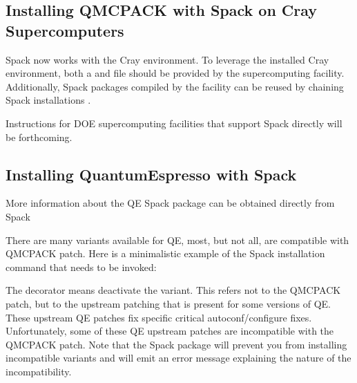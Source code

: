 \documentclass[letterpaper,10pt,english]{sphinxmanual}
\begin{document}
\subsection{Installing QMCPACK with Spack on Cray Supercomputers}
\label{\detokenize{installation:installing-qmcpack-with-spack-on-cray-supercomputers}}
Spack now works with the Cray environment. To leverage the installed
Cray environment, both a  and
 file should be provided by the supercomputing
facility. Additionally, Spack packages compiled by the facility can be
reused by chaining Spack installations
.

Instructions for DOE supercomputing facilities that support Spack directly will be forthcoming.


\subsection{Installing Quantum\sphinxhyphen{}Espresso with Spack}
\label{\detokenize{installation:installing-quantum-espresso-with-spack}}
More information about the QE Spack package can be obtained directly
from Spack

\begin{sphinxVerbatim}[commandchars=\\\{\}]
  
\end{sphinxVerbatim}

There are many variants available for QE, most, but not all, are
compatible with QMCPACK patch. Here is a minimalistic example of the
Spack installation command that needs to be invoked:

\begin{sphinxVerbatim}[commandchars=\\\{\}]
    
\end{sphinxVerbatim}

The \sphinxcode{\sphinxupquote{\textasciitilde{}}} decorator means deactivate the 
variant. This refers not to the QMCPACK patch, but to the upstream
patching that is present for some versions of QE. These upstream QE
patches fix specific critical autoconf/configure fixes. Unfortunately,
some of these QE upstream patches are incompatible with the QMCPACK
patch. Note that the Spack package will prevent you from installing
incompatible variants and will emit an error message explaining the
nature of the incompatibility.
\end{document}
